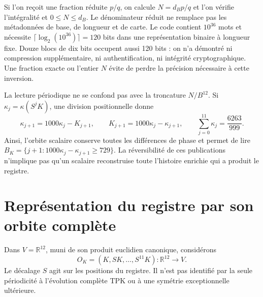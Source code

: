 Si l’on reçoit une fraction réduite \(p/q\), on calcule
\(N=d_Bp/q\) et l’on vérifie l’intégralité et \(0\leq N\leq d_B\).
Le dénominateur réduit ne remplace pas les métadonnées de base, de longueur et de
carte. Le code contient \(10^{36}\) mots et nécessite
\(\lceil\log_2(10^{36})\rceil=120\) bits dans une représentation binaire
à longueur fixe. Douze blocs de dix bits occupent aussi 120 bits : on n’a
démontré ni compression supplémentaire, ni authentification, ni intégrité
cryptographique. Une fraction exacte ou l’entier \(N\) évite de perdre la
précision nécessaire à cette inversion.

La lecture périodique ne se confond pas avec la troncature \(N/B^{12}\). Si \(\kappa_j=\kappa(S^jK)\), une division positionnelle donne
\begin{equation}
 \kappa_{j+1}=1000\kappa_j-K_{j+1},\qquad
 K_{j+1}=1000\kappa_j-\kappa_{j+1},\qquad
 \sum_{j=0}^{11}\kappa_j=\frac{6263}{999}.
 \label{x_reciprocidad:lib01:orbita-kappa}
\end{equation}
Ainsi, l'orbite scalaire conserve toutes les différences de phase et permet de lire \(B_K=\{j+1:1000\kappa_j-\kappa_{j+1}\geq729\}\). La réversibilité de ces publications n'implique pas qu'un scalaire reconstruise toute l'histoire enrichie qui a produit le registre.

\section{Représentation du registre par son orbite complète}
\label{x_reciprocidad:lib01:orbita}

Dans \(V=\mathbb R^{12}\), muni de son produit euclidien canonique, considérons
\[
 O_K=(K,SK,\ldots,S^{11}K):\mathbb R^{12}\longrightarrow V.
\]
Le décalage \(S\) agit sur les positions du registre. Il n’est pas
identifié par la seule périodicité à l’évolution complète TPK ou à
une symétrie exceptionnelle ultérieure.

